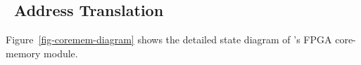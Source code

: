\documentclass[10pt,times,twocolumn]{article}
\begin{document}
\begin{appendices}

\section{\sys\ Address Translation}

Figure~\ref{fig-coremem-diagram} shows the detailed state diagram of \sys's FPGA
core-memory module.


\end{appendices}
\end{document}
